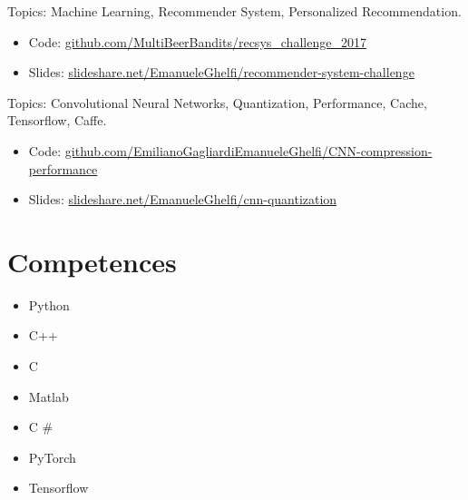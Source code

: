 \documentclass[11pt,a4paper,sans]{moderncv} %
\begin{document}
{
Topics: Machine Learning, Recommender System, Personalized Recommendation.
\begin{itemize}
	\item Code: \href{https://github.com/MultiBeerBandits/recsys\_challenge\_2017}{github.com/MultiBeerBandits/recsys\_challenge\_2017}
	\item Slides: \href{https://www.slideshare.net/EmanueleGhelfi/recommender-system-challenge}{slideshare.net/EmanueleGhelfi/recommender-system-challenge}
\end{itemize}
}


{
Topics: Convolutional Neural Networks, Quantization, Performance, Cache, Tensorflow, Caffe. 
\begin{itemize}
	\item Code: \href{https://github.com/EmilianoGagliardiEmanueleGhelfi/CNN-compression-performance}{github.com/EmilianoGagliardiEmanueleGhelfi/CNN-compression-performance}
	\item Slides: \href{https://www.slideshare.net/EmanueleGhelfi/cnn-quantization}{slideshare.net/EmanueleGhelfi/cnn-quantization}
\end{itemize}
}



\section{Competences}

{
\begin{itemize}
\item Python
\item C++
\item C
\item Matlab
\item C \#
\end{itemize}
}
{
\begin{itemize}
\item PyTorch
\item Tensorflow
\end{itemize}
}
\end{document}
